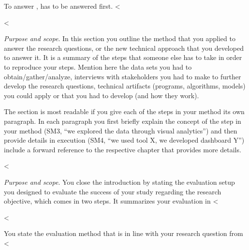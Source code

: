 {{{


To answer ,  has to be answered first.
<%

<%

\emph{Purpose and scope}.
In this section you outline the method that you applied to answer the research questions, or the new technical approach that you developed to answer it.
It is a summary of the steps that someone else has to take in order to reproduce your steps.
Mention here the data sets you had to obtain/gather/analyze, interviews with stakeholders you had to make to further develop the research questions, technical artifacts (programs, algorithms, models) you could apply or that you had to develop (and how they work).

The section is most readable if you give each of the steps in your method its own paragraph.
In each paragraph you first briefly explain the concept of the step in your method (SM3, ``we explored the data through visual analytics'') and then provide details in execution (SM4, ``we used tool X, we developed dashboard Y'') include a forward reference to the respective chapter that provides more details.

<%

\emph{Purpose and scope}.
You close the introduction by stating the evaluation setup you designed to evaluate the success of your study regarding the research objective, which comes in two steps.
It summarizes your evaluation in <%

<%

You state the evaluation method that is in line with your research question from <%

}}}
